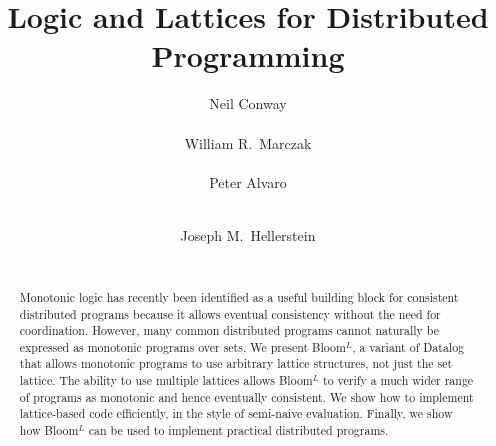 \documentclass{vldb}
\def\lang{Bloom$^L$\xspace}
\begin{document}
\title{Logic and Lattices for Distributed Programming}


\author{
\alignauthor
Neil Conway\\
       \\
\alignauthor
William R.\ Marczak\\
       \\
\alignauthor
Peter Alvaro\\
       \\
\and
\alignauthor
Joseph M.\ Hellerstein\\
       \\
}

\maketitle

\begin{abstract}
  Monotonic logic has recently been identified as a useful building block for
  consistent distributed programs because it allows eventual consistency without
  the need for coordination. However, many common distributed programs cannot
  naturally be expressed as monotonic programs over sets. We present \lang, a
  variant of Datalog that allows monotonic programs to use arbitrary lattice
  structures, not just the set lattice. The ability to use multiple lattices
  allows \lang to verify a much wider range of programs as monotonic and hence
  eventually consistent.  We show how to implement lattice-based code
  efficiently, in the style of semi-naive evaluation. Finally, we show how \lang
  can be used to implement practical distributed programs.
\end{abstract}












\balance
\begin{small}


\end{small}

% 
\end{document}
